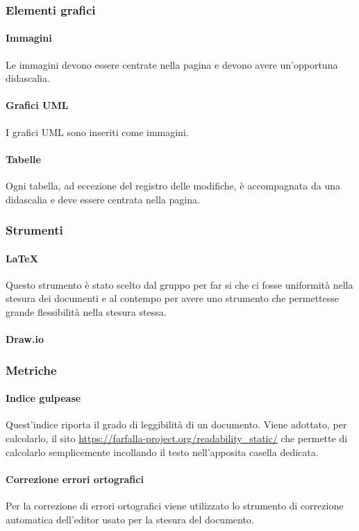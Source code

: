 \documentclass[../norme-di-progetto.tex]{subfiles}
\begin{document}
\subsubsection{Elementi grafici}

\paragraph{Immagini}
Le immagini devono essere centrate nella pagina e devono avere un'opportuna didascalia.

\paragraph{Grafici UML}
I grafici UML sono inseriti come immagini.

\paragraph{Tabelle}
Ogni tabella, ad eccezione del registro delle modifiche, è accompagnata da una didascalia e deve essere centrata nella pagina.

\subsubsection{Strumenti}

\paragraph{\LaTeX}
Questo strumento è stato scelto dal gruppo per far si che ci fosse uniformità nella stesura dei documenti e al contempo per avere uno strumento che permettesse grande flessibilità nella stesura stessa.

\paragraph{Draw.io}


\subsubsection{Metriche}

\paragraph{Indice gulpease}
Quest'indice riporta il grado di leggibilità di un documento. Viene adottato, per calcolarlo, il sito \url{https://farfalla-project.org/readability_static/} che permette di calcolarlo semplicemente incollando il testo nell'apposita casella dedicata.

\paragraph{Correzione errori ortografici}
Per la correzione di errori ortografici viene utilizzato lo strumento di correzione automatica dell'editor usato per la stesura del documento.
\end{document}
